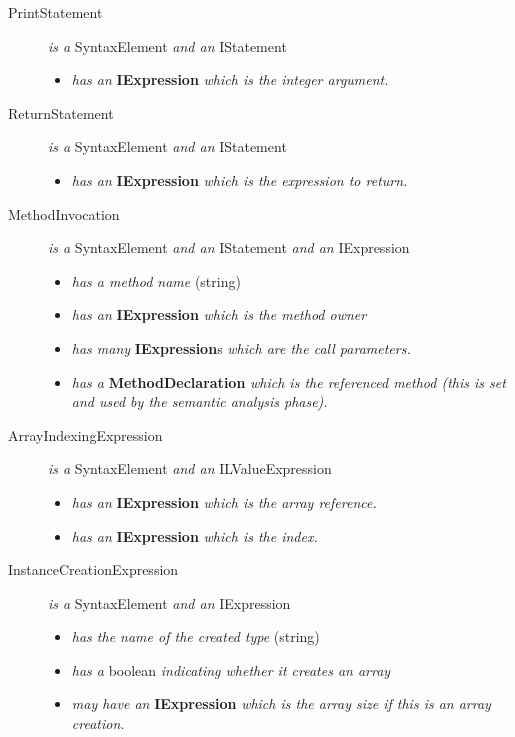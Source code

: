 \documentclass[a4paper,11pt]{article}
\begin{document}
\begin{description}
\begin{itemize}
      \end{itemize}
    \item[PrintStatement] \emph{is a} SyntaxElement \emph{and an} IStatement
      \begin{itemize}
        \item \emph{has an} \textbf{IExpression} \emph{which is the integer argument.}
      \end{itemize}
    \item[ReturnStatement] \emph{is a} SyntaxElement \emph{and an} IStatement
      \begin{itemize}
        \item \emph{has an} \textbf{IExpression} \emph{which is the expression to return.}
      \end{itemize}
    \item[MethodInvocation] \emph{is a} SyntaxElement \emph{and an} IStatement \emph{and an} IExpression
      \begin{itemize}
        \item \emph{has a method name} (string)
        \item \emph{has an} \textbf{IExpression} \emph{which is the method owner}
        \item \emph{has many} \textbf{IExpression}s \emph{which are the call parameters.}
        \item \emph{has a} \textbf{MethodDeclaration} \emph{which is the referenced method (this is set and used by the semantic analysis phase).}
      \end{itemize}
    \item[ArrayIndexingExpression] \emph{is a} SyntaxElement \emph{and an} ILValueExpression
      \begin{itemize}
        \item \emph{has an} \textbf{IExpression} \emph{which is the array reference.}
        \item \emph{has an} \textbf{IExpression} \emph{which is the index.}
      \end{itemize}
    \item[InstanceCreationExpression] \emph{is a} SyntaxElement \emph{and an} IExpression
      \begin{itemize}
        \item \emph{has the name of the created type} (string)
        \item \emph{has a} boolean \emph{indicating whether it creates an array}
        \item \emph{may have an} \textbf{IExpression} \emph{which is the array size if this is an array creation.}

\end{itemize}
\end{description}
\end{document}
